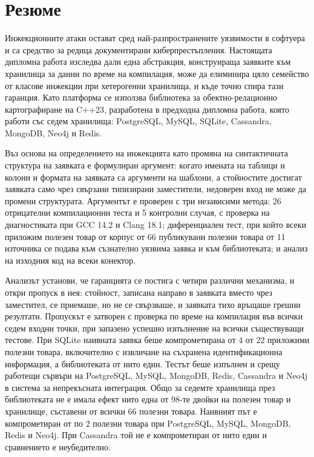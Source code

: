 \section*{Резюме}

Инжекционните атаки остават сред най-разпространените уязвимости в софтуера и са
средство за редица документирани киберпрестъпления. Настоящата дипломна работа
изследва дали една абстракция, конструираща заявките към хранилища за данни по
време на компилация, може да елиминира цяло семейство от класове инжекции при
хетерогенни хранилища, и къде точно спира тази гаранция. Като платформа се
използва библиотека за обектно-релационно картографиране на C++23, разработена в
предходна дипломна работа, която работи със седем хранилища: PostgreSQL, MySQL,
SQLite, Cassandra, MongoDB, Neo4j и Redis.

Въз основа на определението на инжекцията като промяна на синтактичната
структура на заявката е формулиран аргумент: когато имената на таблици и колони и
формата на заявката са аргументи на шаблони, а стойностите достигат заявката само
чрез свързани типизирани заместители, недоверен вход не може да промени
структурата. Аргументът е проверен с три независими метода: 26 отрицателни
компилационни теста и 5 контролни случая, с проверка на диагностиката при GCC 14.2
и Clang 18.1; диференциален тест, при който всеки приложим полезен товар от корпус
от 66 публикувани полезни товара от 11 източника се подава към съзнателно уязвима
заявка и към библиотеката; и анализ на изходния код на всеки конектор.

Анализът установи, че гаранцията се постига с четири различни механизма, и откри
пропуск в нея: стойност, записана направо в заявката вместо чрез заместител, се
приемаше, но не се свързваше, и заявката тихо връщаше грешни резултати. Пропускът
е затворен с проверка по време на компилация във всички седем входни точки, при
запазено успешно изпълнение на всички съществуващи тестове. При SQLite
наивната заявка беше компрометирана от 4 от 22 приложими полезни товара,
включително с извличане на съхранена идентификационна информация, а библиотеката
от нито един. Тестът беше изпълнен и срещу работещи сървъри на PostgreSQL, MySQL,
MongoDB, Redis, Cassandra и Neo4j в система за непрекъсната интеграция. Общо за
седемте хранилища през библиотеката не е имала ефект нито една от 98-те
двойки на полезен товар и хранилище, съставени от всички 66 полезни товара.
Наивният път е компрометиран от по 2 полезни товара при PostgreSQL, MySQL,
MongoDB, Redis и Neo4j. При Cassandra той не е компрометиран от нито един и
сравнението е неубедително.

